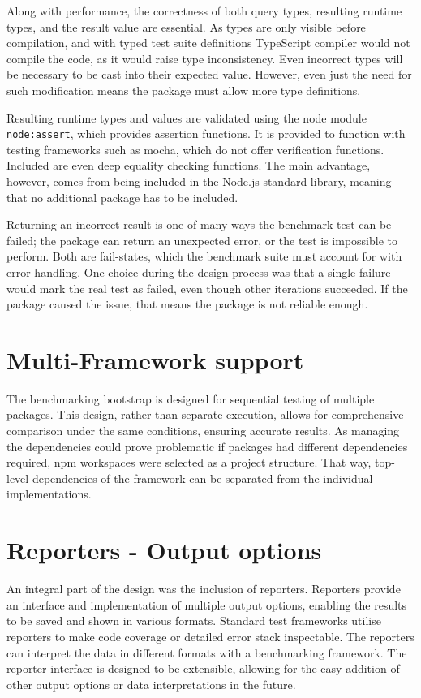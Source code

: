 Along with performance, the correctness of both query types, resulting runtime
types, and the result value are essential. As types are only visible before
compilation, and with typed test suite definitions TypeScript compiler would not
compile the code, as it would raise type inconsistency. Even incorrect types
will be necessary to be cast into their expected value. However, even just the
need for such modification means the package must allow more type definitions.

Resulting runtime types and values are validated using the node module
\texttt{node:assert}, which provides assertion functions. It is provided to
function with testing frameworks such as mocha, which do not offer verification
functions. Included are even deep equality checking functions. The main
advantage, however, comes from being included in the Node.js standard library,
meaning that no additional package has to be included.

Returning an incorrect result is one of many ways the benchmark test can be
failed; the package can return an unexpected error, or the test is impossible to
perform. Both are fail-states, which the benchmark suite must account for with
error handling. One choice during the design process was that a single failure
would mark the real test as failed, even though other iterations succeeded. If
the package caused the issue, that means the package is not reliable enough.

\section{Multi-Framework support}

The benchmarking bootstrap is designed for sequential testing of multiple
packages. This design, rather than separate execution, allows for comprehensive
comparison under the same conditions, ensuring accurate results. As managing the
dependencies could prove problematic if packages had different dependencies
required, npm workspaces were selected as a project structure. That way,
top-level dependencies of the framework can be separated from the individual
implementations.

\section{Reporters - Output options}

An integral part of the design was the inclusion of reporters. Reporters provide
an interface and implementation of multiple output options, enabling the results
to be saved and shown in various formats. Standard test frameworks utilise
reporters to make code coverage or detailed error stack inspectable. The
reporters can interpret the data in different formats with a benchmarking
framework. The reporter interface is designed to be extensible, allowing for the
easy addition of other output options or data interpretations in the future.